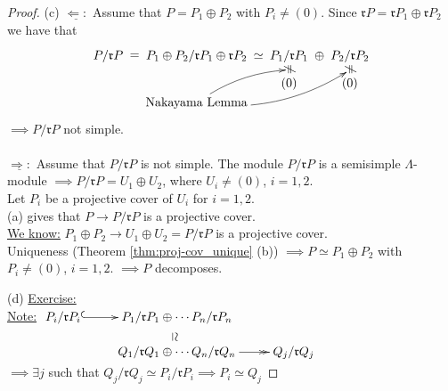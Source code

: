 \begin{prop}
\begin{proof}
(c) $\underline{\Leftarrow:}$ Assume that $P = P_1 \oplus P_2$ with
$P_i \neq (0)$. Since $\mathfrak{r}P = \mathfrak{r}P_1 \oplus
\mathfrak{r}P_2$ we have that
\[\xymatrix@C-1pc@R-2pc{
P / \mathfrak{r}P \ar@{}[r]|-*[@]{=} & P_1 \oplus P_2 / \mathfrak{r}P_1 \oplus \mathfrak{r}P_2 \ar@{}[r]|-*[@]{\simeq} & P_1 / \mathfrak{r}P_1 \ar@{}[r]|-*[@]{\oplus} \ar@{}[dd]|-*[@]{\neq} & P_2 /\mathfrak{r}P_2 \ar@{}[dd]|-*[@]{\neq}\\
                  &                                                         &                 &                 \\
                  &                                                         &      (0)        &      (0)       \\
                  &            \text{Nakayama Lemma} \ar@/^/[uur] \ar@/_1pc/[uurr]                       &                 &                 \\
}
\]
$\implies P/ \mathfrak{r}P$ not simple.
\\\\
$\underline{\Rightarrow :}$ Assume that $P / \mathfrak{r}P$ is not
simple. The module $P/\mathfrak{r}P$ is a semisimple $\Lambda$-module
$\implies P / \mathfrak{r}P = U_1 \oplus U_2$, where $U_i \neq (0)$, $i=1,2$.\\ 
Let $P_i$ be a projective cover of $U_i$ for $i=1,2$.\\
(a) gives that $P \to P /\mathfrak{r}P$ is a projective cover.\\ 
\underline{We know:} $P_1 \oplus P_2 \to U_1 \oplus U_2 = P / \mathfrak{r}P$ is a projective cover.\\
Uniqueness (Theorem \ref{thm:proj-cov_unique} (b)) $\implies P \simeq P_1 \oplus P_2$ with $P_i \neq (0)$, $i=1,2$.
$\implies P$ decomposes.


(d) \underline{Exercise:}\\
\underline{Note:} $\xymatrix@R-1pc{
P_i / \mathfrak{r}P_i \ar@{^{(}->}[r] & P_1 / \mathfrak{r}P_1  \oplus \cdots P_n / \mathfrak{r}P_n \ar@{}[d]|-*[@]{\simeq} \\
 & Q_1 / \mathfrak{r}Q_1  \oplus \cdots Q_n / \mathfrak{r}Q_n \ar@{->>}[r] & Q_j / \mathfrak{r}Q_j  \\
}$\\
$\implies \exists j$ such that $ Q_j / \mathfrak{r}Q_j \simeq  P_i / \mathfrak{r}P_i \implies P_i \simeq Q_j$
\end{proof}
\end{prop}

